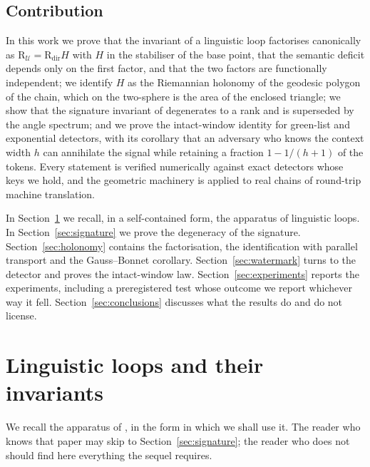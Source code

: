 \documentclass{article}
\theoremstyle{plain}
\theoremstyle{definition}
\numberwithin{equation}{section}
\newcommand{\Uc}{\mathcal{U}}
\begin{document}
\subsection*{Contribution}

In this work we prove that the invariant of a linguistic loop
factorises canonically as $\mathrm{R}_\Uc = \mathrm{R}_{\mathrm{dir}} H$
with $H$ in the stabiliser of the base point, that the semantic deficit
depends only on the first factor, and that the two factors are
functionally independent; we identify $H$ as the Riemannian holonomy of
the geodesic polygon of the chain, which on the two-sphere is the area
of the enclosed triangle; we show that the signature invariant of
\cite{CM25} degenerates to a rank and is superseded by the angle
spectrum; and we prove the intact-window identity for green-list and
exponential detectors, with its corollary that an adversary who knows
the context width $h$ can annihilate the signal while retaining a
fraction $1 - 1/(h+1)$ of the tokens. Every statement is verified
numerically against exact detectors whose keys we hold, and the
geometric machinery is applied to real chains of round-trip machine
translation.

In Section~\ref{sec:loops} we recall, in a self-contained form, the
apparatus of linguistic loops. In Section~\ref{sec:signature} we prove
the degeneracy of the signature. Section~\ref{sec:holonomy} contains the
factorisation, the identification with parallel transport and the
Gauss--Bonnet corollary. Section~\ref{sec:watermark} turns to the
detector and proves the intact-window law. Section~\ref{sec:experiments}
reports the experiments, including a preregistered test whose outcome we
report whichever way it fell. Section~\ref{sec:conclusions} discusses
what the results do and do not license.

\section{Linguistic loops and their invariants}\label{sec:loops}

We recall the apparatus of \cite{CM25}, in the form in which we shall
use it. The reader who knows that paper may skip to
Section~\ref{sec:signature}; the reader who does not should find here
everything the sequel requires.
\end{document}
